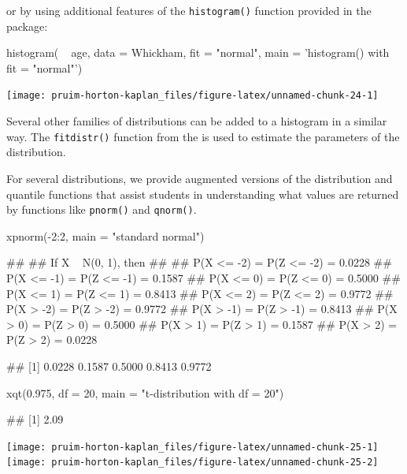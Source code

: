 \noindent
or by using additional features of the \texttt{histogram()} function
provided in the  package:

\begin{Schunk}
\begin{Sinput}
histogram( ~ age, data = Whickham, fit = "normal", 
           main = 'histogram() with fit = "normal"')
\end{Sinput}


\begin{center}\texttt{[image: pruim-horton-kaplan\_files/figure-latex/unnamed-chunk-24-1]} \end{center}

\end{Schunk}

\noindent Several other families of distributions can be added to a
histogram in a similar way. The \texttt{fitdistr()} function from the
 \citep{MASS} is used to estimate the parameters of the
distribution.

For several distributions, we provide augmented versions of the
distribution and quantile functions that assist students in
understanding what values are returned by functions like
\texttt{pnorm()} and \texttt{qnorm()}.

\begin{Schunk}
\begin{Sinput}
xpnorm(-2:2, main = "standard normal")
\end{Sinput}
\begin{Soutput}
## 
## If X ~ N(0, 1), then 
## 
##  P(X <= -2) = P(Z <= -2) = 0.0228
##      P(X <= -1) = P(Z <= -1) = 0.1587
##      P(X <=  0) = P(Z <=  0) = 0.5000
##      P(X <=  1) = P(Z <=  1) = 0.8413
##      P(X <=  2) = P(Z <=  2) = 0.9772
##  P(X >  -2) = P(Z >  -2) = 0.9772
##      P(X >  -1) = P(Z >  -1) = 0.8413
##      P(X >   0) = P(Z >   0) = 0.5000
##      P(X >   1) = P(Z >   1) = 0.1587
##      P(X >   2) = P(Z >   2) = 0.0228
\end{Soutput}
\begin{Soutput}
## [1] 0.0228 0.1587 0.5000 0.8413 0.9772
\end{Soutput}
\begin{Sinput}
xqt(0.975, df = 20, main = "t-distribution with df = 20")
\end{Sinput}
\begin{Soutput}
## [1] 2.09
\end{Soutput}


\begin{center}\texttt{[image: pruim-horton-kaplan\_files/figure-latex/unnamed-chunk-25-1]} \texttt{[image: pruim-horton-kaplan\_files/figure-latex/unnamed-chunk-25-2]} \end{center}

\end{Schunk}

